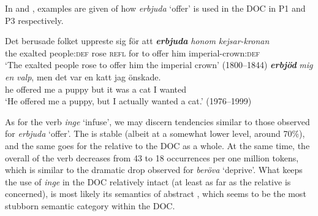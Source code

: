 \documentclass[output=paper]{langscibook}
\begin{document}
\begin{table}
\caption{Frequency measures of the verb-specific DOC with \textit{erbjuda} ‘offer’}
\label{tab:valdeson:15}
\end{table}

In  and , examples are given of how \textit{erbjuda} ‘offer’ is used in the DOC in P1 and P3 respectively.


\ea \label{ex:valdeson:22}
 \gll Det   berusade   folket       uppreste   sig     för   att \textbf{\textit{erbjuda}} \textit{honom} \textit{kejsar-kronan} \\
    the     exalted     people\textsc{:def}   rose       \textsc{refl} for   to offer               him    imperial-crown:\textsc{def}\\
\glt    ‘The exalted people rose to offer him the imperial crown’ (1800–1844)
\ex \label{ex:valdeson:23}
 \textbf{\textit{erbjöd}} \textit{mig} \textit{en} \textit{valp}, {men} {det} {var} {en} {katt} {jag} {önskade}.\\
  he     offered   me     a   puppy   but       it     was   a   cat   I     wanted\\
\glt `He offered me a puppy, but I actually wanted a cat.’ (1976–1999)
\z


\label{sec:valdeson:5.3.3.3}



As for the verb \textit{inge} ‘infuse’, we may discern tendencies similar to those observed for \textit{erbjuda} ‘offer’. The  is stable (albeit at a somewhat lower level, around 70\%), and the same goes for the  relative to the DOC as a whole. At the same time, the overall  of the verb decreases from 43 to 18 occurrences per one million tokens, which is similar to the dramatic drop observed for \textit{beröva} ‘deprive’. What keeps the use of \textit{inge} in the DOC relatively intact (at least as far as the relative  is concerned), is most likely its semantics of abstract , which seems to be the most stubborn semantic category within the DOC.
\end{document}

